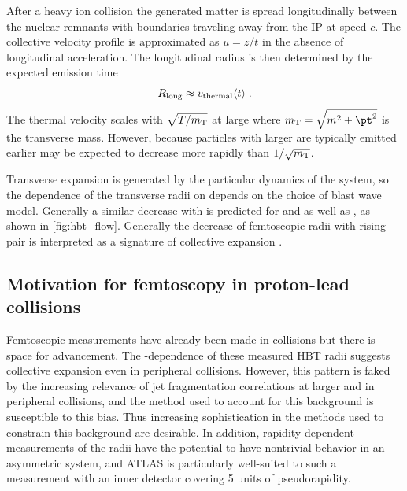 After a heavy ion collision the generated matter is spread longitudinally between the nuclear remnants with boundaries traveling away from the \ac{IP} at speed $c$.
The collective velocity profile is approximated as $u = z/t$ in the absence of longitudinal acceleration.
The longitudinal radius is then determined by the expected emission time
\begin{equation}
  R_{\mathrm{long}} \approx v_\textrm{thermal} \langle t \rangle \; .
\end{equation}
The thermal velocity scales with $\sqrt{T/m_\mathrm{T}}$ at large \mt where $\mt = \sqrt{m^2 + \pt^2}$ is the transverse mass.
However, because particles with larger \mt are typically emitted earlier \Rlong may be expected to decrease more rapidly than $1/\sqrt{m_\mathrm{T}}$.

Transverse expansion is generated by the particular dynamics of the system, so the dependence of the transverse radii on \mt depends on the choice of blast wave model.
Generally a similar decrease with \mt is predicted for \Rout and \Rside as well as \Rlong, as shown in \cref{fig:hbt_flow}. Generally the decrease of femtoscopic radii with rising pair \kt is interpreted as a signature of collective expansion \cite{Kolb:2003dz}.



\subsection{Motivation for femtoscopy in proton-lead collisions}
Femtoscopic measurements have already been made in \pPb collisions \cite{Abelev:2014pja,Adam:2015pya} but there is space for advancement.
The \kt-dependence of these measured HBT radii suggests collective expansion even in peripheral collisions.
However, this pattern is faked by the increasing relevance of jet fragmentation correlations at larger \kt and in peripheral collisions, and the method used to account for this background is susceptible to this bias.
Thus increasing sophistication in the methods used to constrain this background are desirable.
In addition, rapidity-dependent measurements of the radii have the potential to have nontrivial behavior in an asymmetric \pA system, and ATLAS is particularly well-suited to such a measurement with an inner detector covering 5 units of pseudorapidity.

